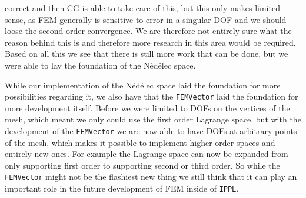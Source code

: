 correct and then CG is able to take care of this, but this only makes limited sense, as FEM generally is sensitive to error in a singular DOF and we should loose the second order convergence. We are therefore not entirely sure what the reason behind this is and therefore more research in this area would be required. Based on all this we see that there is still more work that can be done, but we were able to lay the foundation of the Nédélec space.\medskip

While our implementation of the Nédélec space laid the foundation for more possibilities regarding it, we also have that the \texttt{FEMVector} laid the foundation for more development itself. Before we were limited to DOFs on the vertices of the mesh, which meant we only could use the first order Lagrange space, but with the development of the \texttt{FEMVector} we are now able to have DOFs at arbitrary points of the mesh, which makes it possible to implement higher order spaces and entirely new ones. For example the Lagrange space can now be expanded from only supporting first order to supporting second or third order. So while the \texttt{FEMVector} might not be the flashiest new thing we still think that it can play an important role in the future development of FEM inside of \texttt{IPPL}.